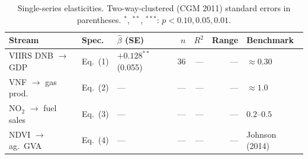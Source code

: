 \begin{table}[H]
\centering\small
\caption{Single-series elasticities. Two-way-clustered (CGM 2011) standard errors in parentheses. $^{*}$, $^{**}$, $^{***}$: $p<0.10, 0.05, 0.01$.}
\label{tab:elasticities}
\begin{tabular}{lllrrrl}
\toprule
Stream & Spec. & $\hat\beta$ (SE) & $n$ & $R^2$ & Range & Benchmark \\
\midrule
VIIRS DNB $\to$ GDP & Eq.~(1) & $+0.128^{**}$ (0.055) & 36 & --- & --- & \citet{hsw2012} $\approx 0.30$ \\
VNF $\to$ gas prod. & Eq.~(2) & --- & --- & --- & --- & \citet{do_etal2018} $\approx 1.0$ \\
NO$_2$ $\to$ fuel sales & Eq.~(3) & --- & --- & --- & --- & \citet{bauwens2020} $0.2$--$0.5$ \\
NDVI $\to$ ag.\ GVA & Eq.~(4) & --- & --- & --- & --- & Johnson (2014) \\
\bottomrule
\end{tabular}
\end{table}